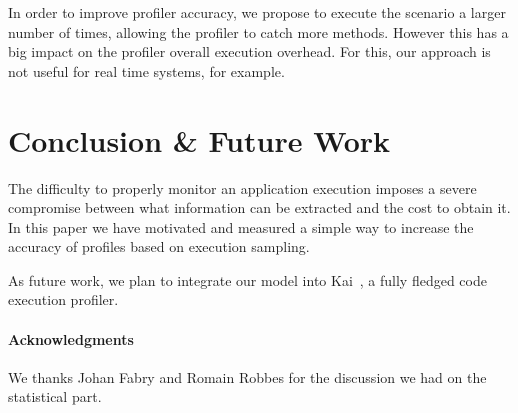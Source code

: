 \documentclass{sig-alternate}
\newcommand{\vp}[1]{\nb{Vanessa}{orange}{#1}}
\newcommand{\jp}[1]{\nb{Juan Pablo}{green}{#1}}
\newcommand{\seclabel}[1]{\label{sec:#1}}
\begin{document}





In order to improve profiler accuracy, we propose to execute the scenario a larger number of times, allowing the profiler to catch more methods. However this has a big impact on the profiler overall execution overhead. For this, our approach is not useful for real time systems, for example.

\section{Conclusion \& Future Work}\seclabel{conclusion}

The difficulty to properly monitor an application execution imposes a severe compromise between what information can be extracted and the cost to obtain it. In this paper we have motivated and measured a simple way to increase the accuracy of profiles based on execution sampling.

As future work, we plan to integrate our model into Kai~\cite{Berg11f}, a fully fledged code execution profiler.


\paragraph{Acknowledgments} We thanks Johan Fabry and Romain Robbes for the discussion we had on the statistical part.





%
\end{document}
